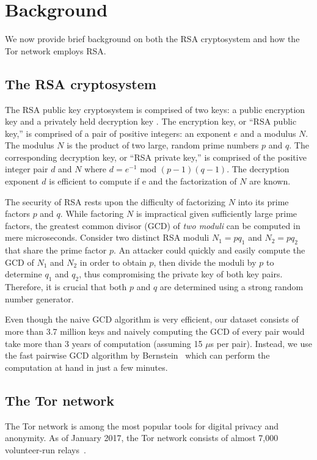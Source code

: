 \section{Background}
\label{sec:background}
We now provide brief background on both the RSA cryptosystem and how the Tor
network employs RSA.

\subsection{The RSA cryptosystem}
The RSA public key cryptosystem is comprised of two keys: a public encryption
key and a privately held decryption key \cite{rivest1978}. The encryption key,
or ``RSA public key,'' is comprised of a pair of positive integers: an exponent
$e$ and a modulus $N$. The modulus $N$ is the product of two large, random prime
numbers $p$ and $q$. The corresponding decryption key, or ``RSA private key,''
is comprised of the positive integer pair $d$ and $N$ where $d = e^{-1}$ mod $(p
- 1)(q - 1)$.  The decryption exponent $d$ is efficient to compute if e and the
factorization of $N$ are known.

The security of RSA rests upon the difficulty of factorizing $N$ into its prime
factors $p$ and $q$.  While factoring $N$ is impractical given sufficiently
large prime factors, the greatest common divisor (GCD) of \emph{two moduli} can
be computed in mere microseconds.  Consider two distinct RSA moduli $N_1 = pq_1$
and $N_2 = pq_2$ that share the prime factor $p$.  An attacker could quickly and
easily compute the GCD of $N_1$ and $N_2$ in order to obtain $p$, then divide
the moduli by $p$ to determine $q_1$ and $q_2$, thus compromising the private
key of both key pairs.  Therefore, it is crucial that both $p$ and $q$ are
determined using a strong random number generator.

Even though the naive GCD algorithm is very efficient, our dataset consists of
more than 3.7 million keys and naively computing the GCD of every pair would
take more than 3 years of computation (assuming 15 $\mu$s per pair). Instead,
we use the fast pairwise GCD algorithm by Bernstein~\cite{Bernstein04} which
can perform the computation at hand in just a few minutes.

\subsection{The Tor network}
\label{sec:tor-network}
The Tor network is among the most popular tools for digital privacy and
anonymity. As of January 2017, the Tor network consists of almost 7,000
volunteer-run relays~\cite{tormetrics}.

